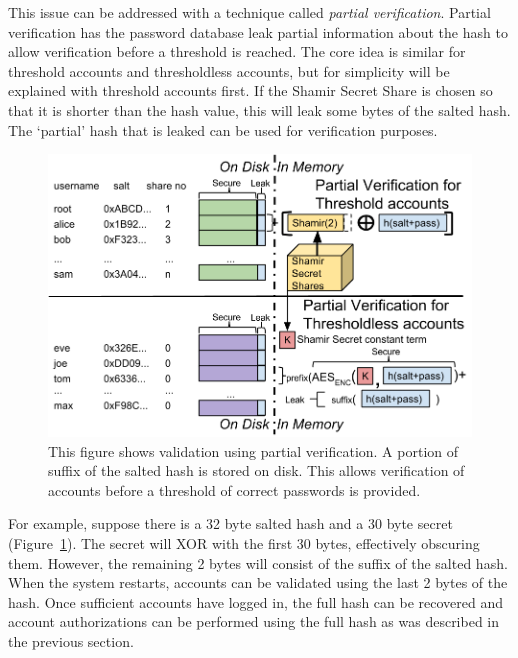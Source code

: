 This issue can be addressed with a technique called \emph{partial 
verification}.   Partial verification has the password database
leak partial information about the hash to allow verification before a threshold
is reached.   The core idea is similar for threshold accounts and 
thresholdless accounts, but for simplicity will be explained with threshold
accounts first.   If the Shamir Secret Share is chosen so that it is shorter
than the hash value, this will leak some bytes of the salted hash.
The `partial' hash that is leaked can be used for verification purposes.


\begin{figure}[t]
\center
\includegraphics[width=1.05\columnwidth]{figures/partialverification.png}
\caption{This figure shows validation using partial verification.
A portion of suffix of the salted hash is stored on disk.  This
allows verification of accounts before a threshold of correct passwords is
provided.
}
\label{fig-partialverification}
\end{figure}

For example, suppose there is a 32 byte salted hash and a 30 byte 
secret (Figure~\ref{fig-partialverification}).   The secret will XOR with
the first 30 bytes, effectively obscuring them.   However, the remaining
2 bytes will consist of the suffix of the salted hash.   When the
system restarts, accounts can be validated using the last 2 bytes of the
hash.   Once sufficient accounts have logged in, the full
hash can be recovered and account authorizations can be 
performed using the full hash as was described in the 
previous section.

